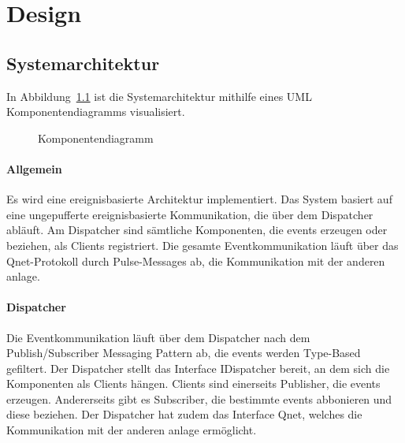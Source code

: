 \chapter{Design}\label{ch:design}



\section{Systemarchitektur}\label{sec:systemarchitektur}


In Abbildung~\ref{fig:cmp} ist die Systemarchitektur mithilfe eines UML Komponentendiagramms
visualisiert.

\begin{figure}[h]
    \centering
    \caption{Komponentendiagramm}
    \label{fig:cmp}
\end{figure}

\subsubsection{Allgemein}
Es wird eine ereignisbasierte Architektur implementiert.
Das System basiert auf eine ungepufferte ereignisbasierte Kommunikation,
die über dem Dispatcher abläuft. Am Dispatcher sind sämtliche Komponenten,
die \glspl{event} erzeugen oder beziehen, als Clients registriert.
Die gesamte Eventkommunikation läuft über das Qnet-Protokoll durch Pulse-Messages ab,
 die Kommunikation mit der anderen \gls{anlage}.

\subsubsection{Dispatcher}
Die Eventkommunikation läuft über dem Dispatcher nach dem Publish/Subscriber Messaging Pattern ab,
die \glspl{event} werden Type-Based gefiltert. Der Dispatcher stellt das Interface IDispatcher bereit,
an dem sich die Komponenten als Clients hängen. Clients sind einerseits Publisher,
die \glspl{event} erzeugen. Andererseits gibt es Subscriber, die bestimmte \glspl{event} abbonieren und diese beziehen.
Der Dispatcher hat zudem das Interface Qnet, welches die Kommunikation mit der anderen \gls{anlage} ermöglicht.

